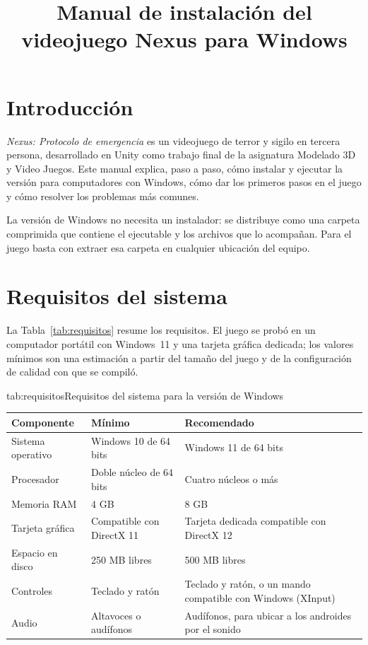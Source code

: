 \documentclass[stu,letterpaper,12pt,donotrepeattitle,floatsintext]{apa7}
\title{Manual de instalación del videojuego Nexus para Windows}
\begin{document}
\maketitle

\section{Introducción}

\textit{Nexus: Protocolo de emergencia} es un videojuego de terror y sigilo en tercera persona,
desarrollado en Unity \parencite{unity2026} como trabajo final de la asignatura Modelado 3D y Video
Juegos. Este manual explica, paso a paso, cómo instalar y ejecutar la versión para computadores con
Windows, cómo dar los primeros pasos en el juego y cómo resolver los problemas más comunes.

La versión de Windows no necesita un instalador: se distribuye como una carpeta comprimida que
contiene el ejecutable  y los archivos que lo acompañan. Para  el
juego basta con extraer esa carpeta en cualquier ubicación del equipo.

\section{Requisitos del sistema}

La Tabla~\ref{tab:requisitos} resume los requisitos. El juego se probó en un computador portátil con
Windows~11 y una tarjeta gráfica dedicada; los valores mínimos son una estimación a partir del tamaño
del juego y de la configuración de calidad con que se compiló.

\begin{TablaAPA}{tab:requisitos}{Requisitos del sistema para la versión de Windows}
\begin{tabularx}{\linewidth}{P{3.6cm}LL}
\toprule
Componente & Mínimo & Recomendado \\
\midrule
Sistema operativo & Windows 10 de 64 bits & Windows 11 de 64 bits \\
Procesador & Doble núcleo de 64 bits & Cuatro núcleos o más \\
Memoria RAM & 4 GB & 8 GB \\
Tarjeta gráfica & Compatible con DirectX 11 & Tarjeta dedicada compatible con DirectX 12 \\
Espacio en disco & 250 MB libres & 500 MB libres \\
Controles & Teclado y ratón & Teclado y ratón, o un mando compatible con Windows (XInput) \\
Audio & Altavoces o audífonos & Audífonos, para ubicar a los androides por el sonido \\
\bottomrule
\end{tabularx}
\end{TablaAPA}
\end{document}
